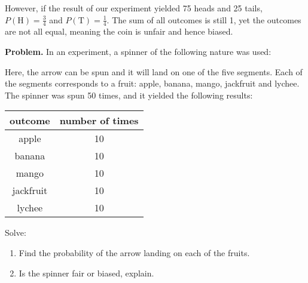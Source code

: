 \documentclass{article}
\begin{document}
However, if the result of our experiment yielded 75 heads and 25 tails, $P(\textrm{H}) = \frac{3}{4}
$ and $P(\textrm{T})=\frac{1}{4}$. The sum of all outcomes is still 1, yet the outcomes are not
all equal, meaning the coin is unfair and hence biased.

\newpage
\textbf{Problem.} In an experiment, a spinner of the following nature was used:

\begin{center}


\end{center}
Here, the arrow can be spun and it will land on one of the five segments. Each of the segments 
corresponds to a fruit: apple, banana, mango, jackfruit and lychee. The spinner was spun 50 times,
and it yielded the following results:

\begin{center}
	\begin{tabular}{ | c | c | }
		\hline
		outcome & number of times \\
		\hline\hline
		apple & 10 \\
		banana & 10 \\
		mango & 10 \\
		jackfruit & 10 \\
		lychee & 10 \\
		\hline
	\end{tabular}
\end{center}
Solve:
\begin{enumerate}
	\item Find the probability of the arrow landing on each of the fruits.
	\item Is the spinner fair or biased, explain.
\end{enumerate}
\end{document}
